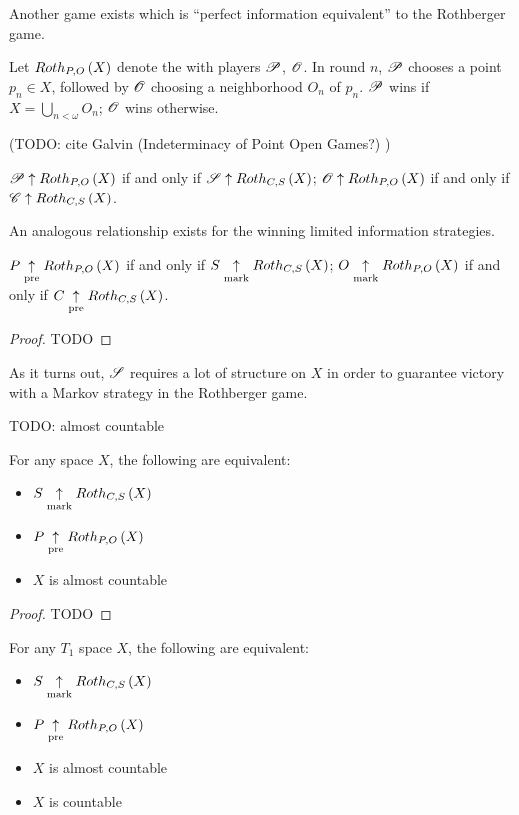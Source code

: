 Another game exists which is ``perfect information equivalent'' to the
Rothberger game.

\begin{game}
  Let $Roth_{P,O}\left({X}\right)$ denote the  with
  players $\mathscr{P}$, $\mathscr{O}$. In round $n$, $\mathscr{P}$ chooses a point $p_n\in X$,
  followed by $\mathscr{O}$ choosing a neighborhood $O_n$ of $p_n$.
  $\mathscr{P}$ wins if $X=\bigcup_{n<\omega} O_n$; $\mathscr{O}$ wins otherwise.
\end{game}

(TODO: cite Galvin (Indeterminacy of Point Open Games?) )

\begin{thm}
  $\mathscr{P}\uparrow Roth_{P,O}\left({X}\right)$ if and only if $\mathscr{S}\uparrow Roth_{C,S}\left({X}\right)$;
  $\mathscr{O}\uparrow Roth_{P,O}\left({X}\right)$ if and only if $\mathscr{C}\uparrow Roth_{C,S}\left({X}\right)$.
\end{thm}

\newpage

An analogous relationship exists for the winning limited information
strategies.

\begin{thm}
  $P\underset{\text{pre}}{\uparrow}Roth_{P,O}\left({X}\right)$ if and only if $S\underset{\text{mark}}{\uparrow}Roth_{C,S}\left({X}\right)$;
  $O\underset{\text{mark}}{\uparrow}Roth_{P,O}\left({X}\right)$ if and only if $C\underset{\text{pre}}{\uparrow}Roth_{C,S}\left({X}\right)$.
\end{thm}

\begin{proof}
  TODO
\end{proof}

As it turns out, $\mathscr{S}$ requires a lot of structure on $X$ in order to
guarantee victory with a Markov strategy in the Rothberger game.

\begin{defn}
  TODO: almost countable
\end{defn}

\begin{thm}
  For any space $X$, the following are equivalent:
  \begin{itemize}
    \item $S\underset{\text{mark}}{\uparrow}Roth_{C,S}\left({X}\right)$
    \item $P\underset{\text{pre}}{\uparrow}Roth_{P,O}\left({X}\right)$
    \item $X$ is almost countable
  \end{itemize}
\end{thm}

\begin{proof}
  TODO
\end{proof}

\begin{thm}
  For any $T_1$ space $X$, the following are equivalent:
  \begin{itemize}
    \item $S\underset{\text{mark}}{\uparrow}Roth_{C,S}\left({X}\right)$
    \item $P\underset{\text{pre}}{\uparrow}Roth_{P,O}\left({X}\right)$
    \item $X$ is almost countable
    \item $X$ is countable
  \end{itemize}
\end{thm}

